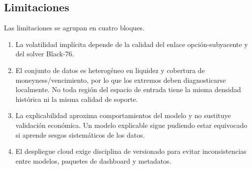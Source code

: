 \subsection{Limitaciones}
\label{subsec:limitaciones}

Las limitaciones se agrupan en cuatro bloques. 

\begin{enumerate}
    \item La volatilidad implícita depende de la calidad del enlace opción-subyacente y del solver Black-76. 
    \item El conjunto de datos es heterogéneo en liquidez y cobertura de moneyness/vencimiento, por lo que los extremos deben diagnosticarse localmente. No toda región del espacio de entrada tiene la misma densidad histórica ni la misma calidad de soporte.
    \item La explicabilidad aproxima comportamientos del modelo y no sustituye validación económica. Un modelo explicable sigue pudiendo estar equivocado si aprende sesgos sistemáticos de los datos.
    \item El despliegue cloud exige disciplina de versionado para evitar inconsistencias entre modelos, paquetes de dashboard y metadatos.
\end{enumerate}


